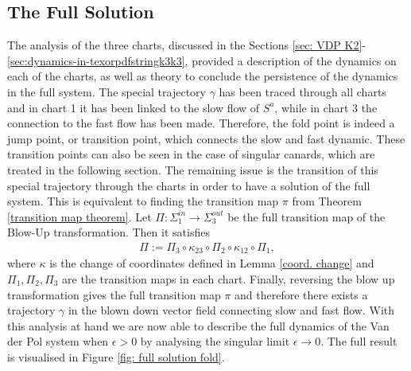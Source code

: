 \subsection{The Full Solution}
The analysis of the three charts, discussed in the Sections \ref{sec: VDP K2}-\ref{sec:dynamics-in-texorpdfstringk3k3}, provided a description of the dynamics on each of the charts, as well as theory to conclude the persistence of the dynamics in the full system.
The special trajectory $\gamma$ has been traced through all charts and in chart 1 it has been linked to the slow flow of $S^a$, while in chart 3 the connection to the fast flow has been made. Therefore, the fold point is indeed a jump point, or transition point, which connects the slow and fast dynamic.
These transition points can also be seen in the case of singular canards, which are treated in the following section.
The remaining issue is the transition of this special trajectory through the charts in order to have a solution of the full system. 
This is equivalent to finding the transition map $\pi$ from Theorem \ref{transition map theorem}.
Let $\Pi: \Sigma^{in}_1 \to \Sigma^{out}_3$ be the full transition map of the Blow-Up transformation. Then it satisfies
\begin{align*}
\Pi := \Pi_3 \circ \kappa_{23} \circ \Pi_2 \circ \kappa_{12} \circ \Pi_1,
\end{align*}
where $\kappa$ is the change of coordinates defined in Lemma \ref{coord. change} and $\Pi_1, \Pi_2, \Pi_3$ are the transition maps in each chart.
Finally, reversing the blow up transformation gives the full transition map $\pi$ and therefore there exists a trajectory $\gamma$ in the blown down vector field connecting slow and fast flow.
With this analysis at hand we are now able to describe the full dynamics of the Van der Pol system when $\epsilon>0$ by analysing the singular limit $\epsilon \to 0$. The full result is visualised in Figure \ref{fig: full solution fold}.
